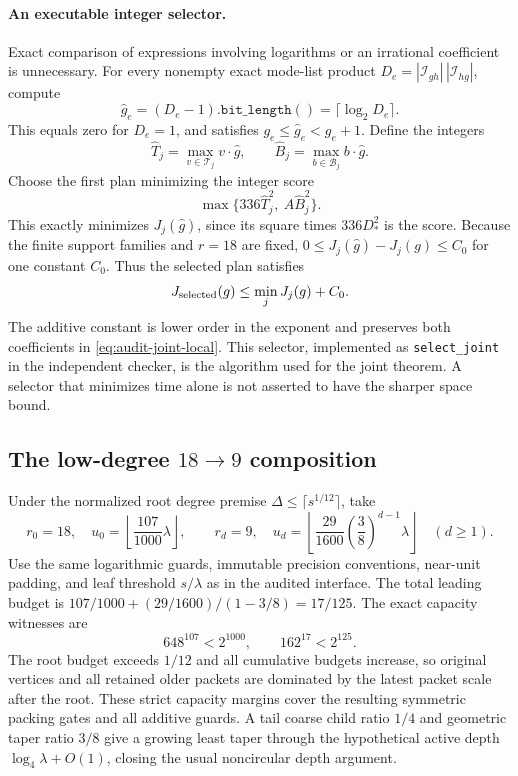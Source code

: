\paragraph{An executable integer selector.}
Exact comparison of expressions involving logarithms or an irrational
coefficient is unnecessary. For every nonempty exact mode-list product
$D_e=|\mathcal I_{gh}|\,|\mathcal I_{hg}|$, compute
\[
 \widehat g_e=(D_e-1).\texttt{bit\_length}()
             =\lceil\log_2D_e\rceil.
\]
This equals zero for $D_e=1$, and satisfies
$g_e\le\widehat g_e<g_e+1$. Define the integers
\[
 \widehat T_j=\max_{v\in\mathcal T_j}v\cdot\widehat g,
 \qquad \widehat B_j=\max_{b\in\mathcal B_j}b\cdot\widehat g.
\]
Choose the first plan minimizing the integer score
\begin{equation}\label{eq:audit-selector}
 \max\{336\widehat T_j^2,\ A\widehat B_j^2\}.
\end{equation}
This exactly minimizes $J_j(\widehat g)$, since its square times
$336D_*^2$ is the score. Because the finite support families and $r=18$ are
fixed, $0\le J_j(\widehat g)-J_j(g)\le C_0$ for one constant $C_0$.
Thus the selected plan satisfies
\[
 J_{\rm selected}(g)\le\min_jJ_j(g)+C_0.
\]
The additive constant is lower order in the exponent and preserves both
coefficients in \eqref{eq:audit-joint-local}. This selector, implemented
as \texttt{select\_joint} in the independent checker, is the algorithm
used for the joint theorem. A selector that minimizes time alone is not
asserted to have the sharper space bound.

\subsection{The low-degree $18\to9$ composition}

Under the normalized root degree premise
$\Delta\le\lceil s^{1/12}\rceil$, take
\[
 r_0=18,\quad u_0=\left\lfloor\frac{107}{1000}\lambda\right\rfloor,
 \qquad
 r_d=9,\quad u_d=\left\lfloor
       \frac{29}{1600}\left(\frac38\right)^{d-1}\lambda
                         \right\rfloor\quad(d\ge1).
\]
Use the same logarithmic guards, immutable precision conventions, near-unit
padding, and leaf threshold $s/\lambda$ as in the audited interface.
The total leading budget is
$107/1000+(29/1600)/(1-3/8)=17/125$.
The exact capacity witnesses are
\[
 648^{107}<2^{1000},\qquad162^{17}<2^{125}.
\]
The root budget exceeds $1/12$ and all cumulative budgets increase, so
original vertices and all retained older packets are dominated by the
latest packet scale after the root. These strict capacity margins cover
the resulting symmetric packing gates and all additive guards. A tail
coarse child ratio $1/4$ and geometric taper ratio $3/8$ give a growing
least taper through the hypothetical active depth
$\log_4\lambda+O(1)$, closing the usual noncircular depth argument.


